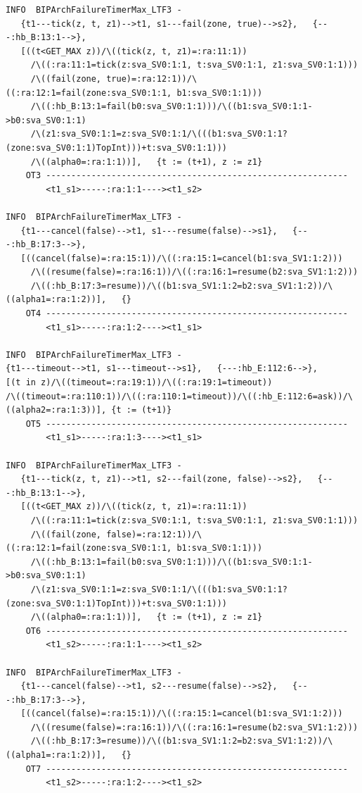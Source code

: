\documentclass{llncs}
\begin{document}
\begin{verbatim}
INFO  BIPArchFailureTimerMax_LTF3 -
   {t1---tick(z, t, z1)-->t1, s1---fail(zone, true)-->s2},   {---:hb_B:13:1-->},
   [((t<GET_MAX z))/\((tick(z, t, z1)=:ra:11:1))
     /\((:ra:11:1=tick(z:sva_SV0:1:1, t:sva_SV0:1:1, z1:sva_SV0:1:1)))
     /\((fail(zone, true)=:ra:12:1))/\((:ra:12:1=fail(zone:sva_SV0:1:1, b1:sva_SV0:1:1)))
     /\((:hb_B:13:1=fail(b0:sva_SV0:1:1)))/\((b1:sva_SV0:1:1->b0:sva_SV0:1:1)
     /\(z1:sva_SV0:1:1=z:sva_SV0:1:1/\(((b1:sva_SV0:1:1?(zone:sva_SV0:1:1)TopInt)))+t:sva_SV0:1:1)))
     /\((alpha0=:ra:1:1))],   {t := (t+1), z := z1}
    OT3 ------------------------------------------------------------
        <t1_s1>-----:ra:1:1----><t1_s2>

INFO  BIPArchFailureTimerMax_LTF3 -
   {t1---cancel(false)-->t1, s1---resume(false)-->s1},   {---:hb_B:17:3-->},
   [((cancel(false)=:ra:15:1))/\((:ra:15:1=cancel(b1:sva_SV1:1:2)))
     /\((resume(false)=:ra:16:1))/\((:ra:16:1=resume(b2:sva_SV1:1:2)))
     /\((:hb_B:17:3=resume))/\((b1:sva_SV1:1:2=b2:sva_SV1:1:2))/\((alpha1=:ra:1:2))],   {}
    OT4 ------------------------------------------------------------
        <t1_s1>-----:ra:1:2----><t1_s1>

INFO  BIPArchFailureTimerMax_LTF3 -
{t1---timeout-->t1, s1---timeout-->s1},   {---:hb_E:112:6-->},
[(t in z)/\((timeout=:ra:19:1))/\((:ra:19:1=timeout))
/\((timeout=:ra:110:1))/\((:ra:110:1=timeout))/\((:hb_E:112:6=ask))/\((alpha2=:ra:1:3))], {t := (t+1)}
    OT5 ------------------------------------------------------------
        <t1_s1>-----:ra:1:3----><t1_s1>

INFO  BIPArchFailureTimerMax_LTF3 -
   {t1---tick(z, t, z1)-->t1, s2---fail(zone, false)-->s2},   {---:hb_B:13:1-->},
   [((t<GET_MAX z))/\((tick(z, t, z1)=:ra:11:1))
     /\((:ra:11:1=tick(z:sva_SV0:1:1, t:sva_SV0:1:1, z1:sva_SV0:1:1)))
     /\((fail(zone, false)=:ra:12:1))/\((:ra:12:1=fail(zone:sva_SV0:1:1, b1:sva_SV0:1:1)))
     /\((:hb_B:13:1=fail(b0:sva_SV0:1:1)))/\((b1:sva_SV0:1:1->b0:sva_SV0:1:1)
     /\(z1:sva_SV0:1:1=z:sva_SV0:1:1/\(((b1:sva_SV0:1:1?(zone:sva_SV0:1:1)TopInt)))+t:sva_SV0:1:1)))
     /\((alpha0=:ra:1:1))],   {t := (t+1), z := z1}
    OT6 ------------------------------------------------------------
        <t1_s2>-----:ra:1:1----><t1_s2>

INFO  BIPArchFailureTimerMax_LTF3 -
   {t1---cancel(false)-->t1, s2---resume(false)-->s2},   {---:hb_B:17:3-->},
   [((cancel(false)=:ra:15:1))/\((:ra:15:1=cancel(b1:sva_SV1:1:2)))
     /\((resume(false)=:ra:16:1))/\((:ra:16:1=resume(b2:sva_SV1:1:2)))
     /\((:hb_B:17:3=resume))/\((b1:sva_SV1:1:2=b2:sva_SV1:1:2))/\((alpha1=:ra:1:2))],   {}
    OT7 ------------------------------------------------------------
        <t1_s2>-----:ra:1:2----><t1_s2>


\end{verbatim}
\end{document}
